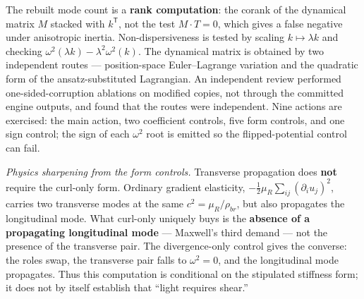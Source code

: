 The rebuilt mode count is a \textbf{rank computation}: the corank of the
dynamical matrix \(M\) stacked with \(k^{\mathsf T}\), not the test
\(M\!\cdot\!T=0\), which gives a false negative under anisotropic inertia.
Non-dispersiveness is tested by scaling \(k\mapsto\lambda k\) and checking
\(\omega^2(\lambda k)-\lambda^2\omega^2(k)\). The dynamical matrix is obtained
by two independent routes --- position-space Euler--Lagrange variation and the
quadratic form of the ansatz-substituted Lagrangian. An independent review
performed one-sided-corruption ablations on modified copies, not through the
committed engine outputs, and found that the routes were independent. Nine
actions are exercised: the main action, two
coefficient controls, five form controls, and one sign control; the sign of
each \(\omega^2\) root is emitted so the flipped-potential control can fail.

\emph{Physics sharpening from the form controls.} Transverse propagation does
\textbf{not} require the curl-only form. Ordinary gradient elasticity,
\(-\tfrac12\mu_R\sum_{ij}(\partial_i u_j)^2\), carries two transverse modes at
the same \(c^2=\mu_R/\rho_{br}\), but also propagates the longitudinal mode.
What curl-only uniquely buys is the \textbf{absence of a propagating
longitudinal mode} --- Maxwell's third demand --- not the presence of the
transverse pair. The divergence-only control gives the converse: the roles
swap, the transverse pair falls to \(\omega^2=0\), and the longitudinal mode
propagates. Thus this computation is conditional on the stipulated stiffness
form; it does not by itself establish that ``light requires shear.''

